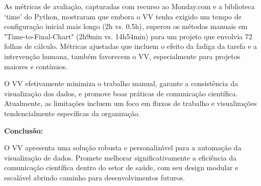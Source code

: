 As métricas de avaliação, capturadas com recurso ao Monday.com e a
biblioteca `time' do Python, mostraram que embora o VV tenha exigido um
tempo de configuração inicial mais longo (2h vs. 0.5h), superou os
métodos manuais em "Time-to-Final-Chart" (2h9min vs. 14h54min) para um
projeto que envolvia 72 folhas de cálculo. Métricas ajustadas que
incluem o efeito da fadiga da tarefa e a intervenção humana, também
favorecem o VV, especialmente para projetos maiores e contínuos.

O VV efetivamente minimiza o trabalho manual, garante a consistência da
visualização dos dados, e promove boas práticas de comunicação
científica. Atualmente, as limitações incluem um foco em fluxos de
trabalho e visualizações tendencialmente específicas da organização.

\textbf{Conclusão:}

O VV apresenta uma solução robusta e personalizável para a automação da
visualização de dados. Promete melhorar significativamente a eficiência
da comunicação científica dentro do setor de saúde, com seu design
modular e escalável abrindo caminho para desenvolvimentos futuros.

